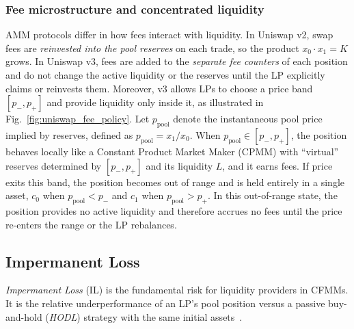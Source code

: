 \documentclass[anonymous]{lipics-v2021}
\begin{document}
\subsubsection{Fee microstructure and concentrated liquidity}
AMM protocols differ in how fees interact with liquidity.
In Uniswap v2, swap fees are \emph{reinvested into the pool reserves} on each trade, so the product $x_0 \cdot x_1{=}K$ grows.
In Uniswap v3, fees are added to the \emph{separate fee counters} of each position and do not change the active liquidity or the reserves until the LP explicitly claims or reinvests them.
Moreover, v3 allows LPs to choose a price band $[p_{-},p_{+}]$ and provide liquidity only inside it, as illustrated in Fig.~\ref{fig:uniswap_fee_policy}.
Let $p_{\text{pool}}$ denote the instantaneous pool price implied by reserves, defined as
$p_{\text{pool}} = x_1/x_0$. 
When $p_{\text{pool}}\in[p_{-},p_{+}]$, the position behaves locally like a Constant Product Market Maker (CPMM) with ``virtual'' reserves determined by $[p_{-},p_{+}]$ and its liquidity $L$, and it earns fees. 
If price exits this band, the position becomes out of range and is held entirely in a single asset, $c_0$ when $p_{\text{pool}}<p_{-}$ and $c_1$ when $p_{\text{pool}}>p_{+}$. 
In this out-of-range state, the position provides no active liquidity and therefore accrues no fees until the price re-enters the range or the LP rebalances.


\subsection{Impermanent Loss}
\label{sec:background_il}

\emph{Impermanent Loss} (IL) is the fundamental risk for liquidity providers in CFMMs. It is the relative underperformance of an LP's pool position versus a passive buy-and-hold (\emph{HODL}) strategy with the same initial assets~\cite{evans2021liquidity, aoyagi2020liquidity}.
\end{document}

